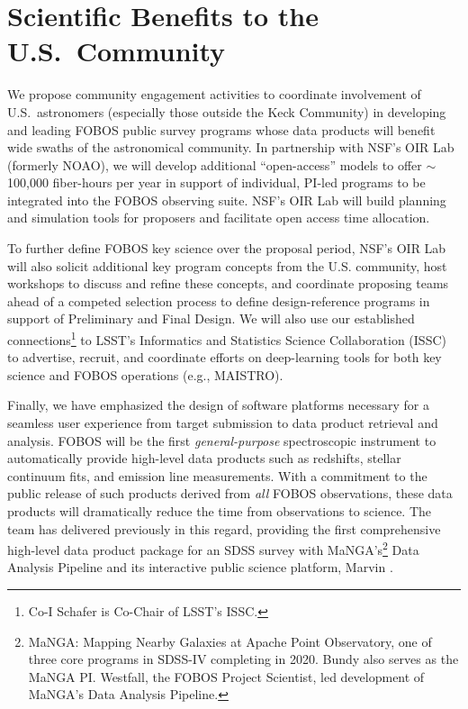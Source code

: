 \documentclass[oneside,11pt]{amsart}
\begin{document}
\section{Scientific Benefits to the U.S.\ Community}

We propose community engagement activities to coordinate involvement of U.S.~astronomers (especially those outside the Keck Community) in developing and leading FOBOS public survey programs whose data products will benefit wide swaths of the astronomical community.  In partnership with NSF's OIR Lab (formerly NOAO), we will develop additional ``open-access'' models to offer $\sim$100,000 fiber-hours per year in support of individual, PI-led programs to be integrated into the FOBOS observing suite.  NSF's OIR Lab will build planning and simulation tools for proposers and facilitate open access time allocation.

To further define FOBOS key science over the proposal period, NSF's OIR Lab will also solicit additional key program
concepts from the U.S. community, host workshops to discuss and refine these concepts, and coordinate proposing teams
ahead of a competed selection process to define design-reference programs in support of Preliminary and Final Design.
We will also use our established connections\footnote{Co-I Schafer is Co-Chair of LSST's ISSC.} to LSST's Informatics
and Statistics Science Collaboration (ISSC) to advertise, recruit, and coordinate efforts on deep-learning tools for
both key science and FOBOS operations (e.g., MAISTRO).

Finally, we have emphasized the design of software platforms necessary for a seamless user experience from target submission to data product retrieval and analysis.  FOBOS will be the first \emph{general-purpose} spectroscopic instrument to automatically provide high-level data products such as redshifts, stellar continuum fits, and emission line measurements.  With a commitment to the public release of such products derived from \emph{all} FOBOS observations, these data products will dramatically reduce the time from observations to science.  The team has delivered previously in this regard, providing the first comprehensive high-level data product package for an SDSS survey with MaNGA's\footnote{MaNGA: Mapping Nearby Galaxies at Apache Point Observatory, one of three core programs in SDSS-IV completing in 2020.  Bundy also serves as the MaNGA PI.  Westfall, the FOBOS Project Scientist, led development of MaNGA's Data Analysis Pipeline.} Data Analysis Pipeline \citep{westfall19} and its interactive public science platform, Marvin \citep{cherinka19}.  
\end{document}
